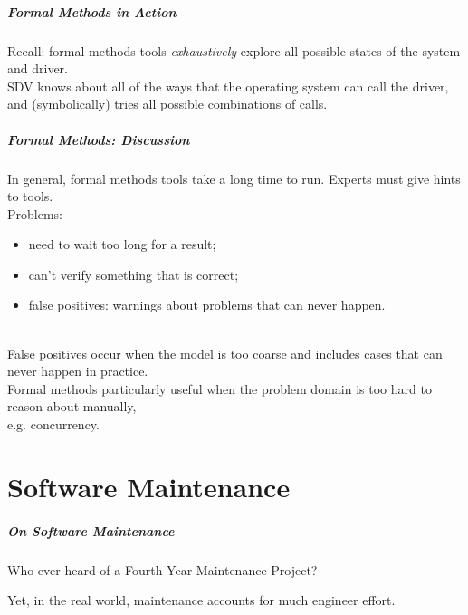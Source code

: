 \begin{frame}
\frametitle{Formal Methods in Action}
\begin{changemargin}{1cm}

Recall: formal methods tools \emph{exhaustively} explore all possible states
of the system and driver. \\[1em]

SDV knows about all of the ways that the operating system can call the
driver, and (symbolically) tries all possible combinations of calls.

\end{changemargin}
\end{frame}


\begin{frame}
\frametitle{Formal Methods: Discussion}

\begin{changemargin}{1cm}

In general, formal methods tools take a long time to run. Experts must give hints to tools.\\[1em]

Problems:
\begin{itemize}
\item need to wait too long for a result;
\item can't verify something that is correct;
\item \alert{false positives}: warnings about problems that can
never happen.
\end{itemize}~\\[1em]

False positives occur when the model is too coarse and includes cases
that can never happen in practice.\\[1em]


Formal methods particularly useful when the problem domain is too
hard to reason about manually, \\ \qquad e.g. concurrency.
\end{changemargin}
\end{frame}

\part{Software Maintenance}
\frame{\partpage}

\begin{frame}
\frametitle{On Software Maintenance}
\begin{changemargin}{1cm}

Who ever heard of a Fourth Year Maintenance Project?

Yet, in the real world, maintenance accounts for much engineer effort.

\end{changemargin}
\end{frame}


